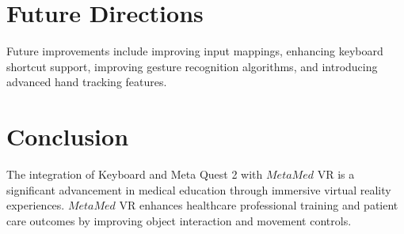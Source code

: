 \section{Future Directions}
Future improvements include improving input mappings, enhancing keyboard shortcut support, improving gesture recognition algorithms, and introducing advanced hand tracking features.
\section{Conclusion}
The integration of Keyboard and Meta Quest 2 with $MetaMed$ VR is a significant advancement in medical education through immersive virtual reality experiences. $MetaMed$ VR enhances healthcare professional training and patient care outcomes by improving object interaction and movement controls.